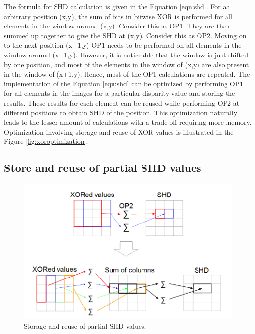 The formula for SHD calculation is given in the Equation \ref{eqn:shd}. For an arbitrary position (x,y), the sum of bits in bitwise XOR is performed for all elements in the window around (x,y). Consider this as OP1. They are then summed up together to give the SHD at (x,y). Consider this as OP2. Moving on to the next position (x+1,y) OP1 needs to be performed on all elements in the window around (x+1,y). However, it is noticeable that the window is just shifted by one position, and most of the elements in the window of (x,y) are also present in the window of (x+1,y). Hence, most of the OP1 calculations are repeated. The implementation of the Equation \ref{eqn:shd} can be optimized by performing OP1 for all elements in the images for a particular disparity value and storing the results. These results for each element can be reused while performing OP2 at different positions to obtain SHD of the position. This optimization naturally leads to the lesser amount of calculations with a trade-off requiring more memory. Optimization involving storage and reuse of XOR values is illustrated in the Figure \ref{fig:xoroptimization}.

\subsection{Store and reuse of partial SHD values}
\label{s:optimizations:shdoptimization}

\begin{figure}[!htbp]
    \center
    \includegraphics[width=.8\linewidth]{figures/parsumoptimization}
    \caption{Storage and reuse of partial SHD values.}
    \label{fig:parsumoptimization}
\end{figure}

